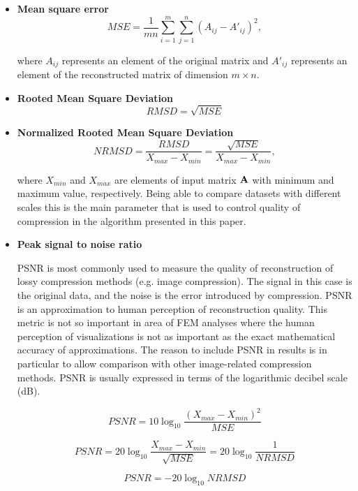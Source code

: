 \begin{itemize}
\item \textbf{Mean square error}
\begin{equation}
MSE=\frac{1}{m n} \sum_{i=1}^{m} \sum_{j=1}^{n} (A_{ij} - A'_{ij})^{2},
\label{eq:mse-def}
\end{equation}

\noindent
where $A_{ij}$ represents an element of the original matrix and $A'_{ij}$ represents an element of the
reconstructed matrix of dimension $m \times n$.

\item \textbf{Rooted Mean Square Deviation}
\begin{equation}
RMSD=\sqrt{MSE}
\label{eq:rmsd-def}
\end{equation}

\item \textbf{Normalized Rooted Mean Square Deviation}
\begin{equation}
NRMSD=\frac{RMSD}{X_{max}-X_{min}}=\frac{\sqrt{MSE}}{X_{max}-X_{min}},
\label{eq:nrmsd-def}
\end{equation}

\noindent
where $X_{min}$ and $X_{max}$ are elements of input matrix $\mathbf{A}$ with minimum and maximum value, respectively. Being able to compare datasets with different scales this is the main parameter that is used to control quality of compression in the algorithm presented in this paper.

\item \textbf{Peak signal to noise ratio}

PSNR is most commonly used to measure the quality of reconstruction of lossy compression methods (e.g. image compression). The signal in this case is the original data, and the noise is the error introduced by compression. PSNR is an approximation to human perception of reconstruction quality. This metric is not so important in area of FEM analyses where the human perception of visualizations is not as important as the exact mathematical accuracy of approximations. The reason to include PSNR in results is in particular to allow comparison with other image-related compression methods. PSNR is usually expressed in terms of the logarithmic decibel scale (dB).

\begin{equation}
PSNR=10\log_{10}\frac{(X_{max}-X_{min})^{2}}{MSE}
\end{equation}

\begin{equation}
PSNR=20\log_{10}\frac{X_{max}-X_{min}}{\sqrt{MSE}}=20\log_{10}\frac{1}{NRMSD}
\end{equation}

\begin{equation}
PSNR=-20\log_{10}NRMSD
\label{eq:psnr-def}
\end{equation}

\end{itemize}

